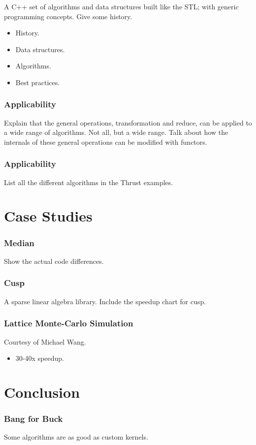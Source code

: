 \documentclass{beamer}
\begin{document}
\begin{frame}
  \frametitle{}
  A C++ set of algorithms and data structures built like
  the STL; with generic programming concepts.
  Give some history.
  \begin{itemize}
    \item History.
    \item Data structures.
    \item Algorithms.
    \item Best practices.
  \end{itemize}
\end{frame}

\begin{frame}
  \frametitle{Applicability}
  Explain that the general operations, transformation and
  reduce, can be applied to a wide range of algorithms.
  Not all, but a wide range. Talk about how the internals of
  these general operations can be modified with functors.
\end{frame}

\begin{frame}
  \frametitle{Applicability}
  List all the different algorithms in the Thrust examples.
\end{frame}

\section{Case Studies}

\begin{frame}
  \frametitle{Median}
  Show the actual code differences.
\end{frame}

\begin{frame}
  \frametitle{Cusp}
  A sparse linear algebra library.
  Include the speedup chart for cusp.
\end{frame}

\begin{frame}
  \frametitle{Lattice Monte-Carlo Simulation}
  Courtesy of Michael Wang.
  \begin{itemize}
    \item 30-40x speedup.
  \end{itemize}
\end{frame}

\section{Conclusion}

\begin{frame}
  \frametitle{Bang for Buck}
  Some algorithms are as good as custom kernels.
\end{frame}
\end{document}
